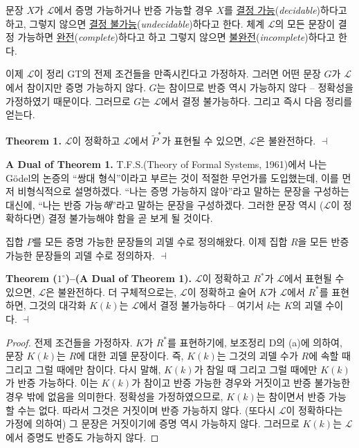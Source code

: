 \documentclass[12pt]{paper}
\newenvironment{context}[1][]
{ \noindent \textbf{{#1}.} }
{ \hfill $ \dashv $ }
\begin{document}
문장 $X$가 $\mathcal{L}$에서 증명 가능하거나 반증 가능할 경우 $X$를 \underline{결정 가능}(\textit{decidable})하다고 하고,
그렇지 않으면 \underline{결정 불가능}(\textit{undecidable})하다고 한다.
체계 $\mathcal{L}$의 모든 문장이 결정 가능하면 \underline{완전}(\textit{complete})하다고 하고 그렇지 않으면 \underline{불완전}(\textit{incomplete})하다고 한다.

이제 $\mathcal{L}$이 정리 GT의 전제 조건들을 만족시킨다고 가정하자.
그러면 어떤 문장 $G$가 $\mathcal{L}$에서 참이지만 증명 가능하지 않다.
$G$는 참이므로 반증 역시 가능하지 않다 --
정확성을 가정하였기 때문이다.
그러므로 $G$는 $\mathcal{L}$에서 결정 불가능하다.
그리고 즉시 다음 정리를 얻는다.

\begin{context}[Theorem 1]
$\mathcal{L}$이 정확하고 $\mathcal{L}$에서 $\widetilde{P}^{*}$가 표현될 수 있으면,
$\mathcal{L}$은 불완전하다.
\end{context}

\begin{context}[A Dual of Theorem 1]
T.F.S.(Theory of Formal Systems, 1961)에서 나는 G\"odel의 논증의 ``쌍대 형식''이라고 부르는 것이 적절한 무언가를 도입했는데,
이를 먼저 비형식적으로 설명하겠다.
``나는 증명 가능하지 않아''라고 말하는 문장을 구성하는 대신에,
``나는 반증 가능\textit{해}''라고 말하는 문장을 구성하겠다.
그러한 문장 역시 ($\mathcal{L}$이 정확하다면) 결정 불가능해야 함을 곧 보게 될 것이다.

집합 $P$를 모든 증명 가능한 문장들의 괴델 수로 정의해왔다.
이제 집합 $R$을 모든 반증 가능한 문장들의 괴델 수로 정의하자.
\end{context}

\begin{context}[Theorem ($1^{\circ}$)--(A Dual of Theorem 1)]
$\mathcal{L}$이 정확하고 $R^{*}$가 $\mathcal{L}$에서 표현될 수 있으면,
$\mathcal{L}$은 불완전하다.
더 구체적으로는, $\mathcal{L}$이 정확하고 술어 $K$가 $\mathcal{L}$에서 $R^{*}$를 표현하면,
그것의 대각화 $K \left( k \right)$는 $\mathcal{L}$에서 결정 불가능하다 --
여기서 $k$는 $K$의 괴델 수이다.
\end{context}

\begin{proof}
전제 조건들을 가정하자.
$K$가 $R^{*}$를 표현하기에, 보조정리 D의 (a)에 의하여,
문장 $K \left( k \right)$는 $R$에 대한 괴델 문장이다.
즉, $K \left( k \right)$는 그것의 괴델 수가 $R$에 속할 때 그리고 그럴 때에만 참이다.
다시 말해, $K \left( k \right)$가 참일 때 그리고 그럴 때에만 $K \left( k \right)$가 반증 가능하다.
이는 $K \left( k \right)$가 참이고 반증 가능한 경우와 거짓이고 반증 불가능한 경우 밖에 없음을 의미한다.
정확성을 가정하였으므로, $K \left( k \right)$는 참이면서 반증 가능할 수는 없다.
따라서 그것은 거짓이며 반증 가능하지 않다.
(또다시 $\mathcal{L}$이 정확하다는 가정에 의하여) 그 문장은 거짓이기에 증명 역시 가능하지 않다.
그러므로 $K \left( k \right)$는 $\mathcal{L}$에서 증명도 반증도 가능하지 않다.
\end{proof}
\end{document}
